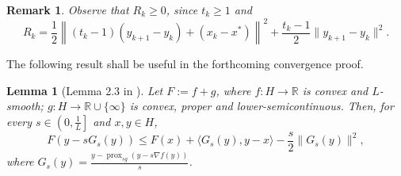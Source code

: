 \documentclass[pdflatex,sn-mathphys-num]{sn-jnl}
\theoremstyle{thmstyleone}
\newtheorem{lemma}[theorem]{Lemma}
\theoremstyle{thmstyletwo}
\newtheorem{remark}{Remark}
\theoremstyle{thmstylethree}
\DeclareMathOperator{\prox}{prox}
\newcommand{\R}{\mathbb{R}}
\begin{document}
\begin{remark}\label{Rem: R_k_bound}
Observe that $R_k\ge 0$, since $t_k\ge 1$ and
$$ R_k = \frac{1}{2}\left\| (t_k-1)(y_{k+1}-y_k) + (x_k-x^*) \right\|^2 + \frac{t_k-1}{2}\| y_{k+1}-y_k \|^2. $$
\end{remark}


The following result shall be useful in the forthcoming convergence proof.

\begin{lemma}[Lemma 2.3 in \cite{Beck_2009}]\label{Lem: prox_bound}
Let $F:=f+g$, where $f:H\to\R$ is convex and $L$-smooth; $g:H\to\mathbb{R}\cup\{\infty\}$ is convex, proper and lower-semicontinuous. Then, for every $s\in\left( 0, \frac{1}{L} \right]$ and $x,y\in H$,
$$ F\left( y-s G_s(y) \right) \le F(x) + \langle G_s(y), y-x \rangle - \frac{s}{2}\| G_s(y) \|^2, $$
where $G_s(y) = \frac{ y-\prox_{s g}\left( y-s\nabla f(y) \right) }{s}$.
\end{lemma}




\end{document}
